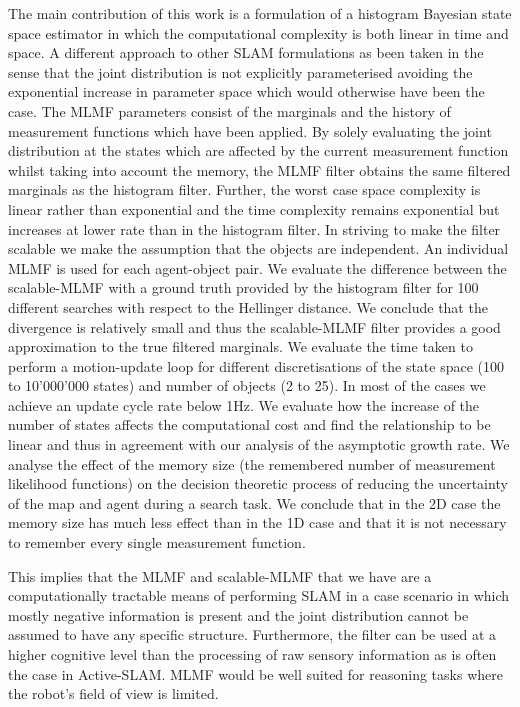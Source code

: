 The main contribution of this work is a formulation of a histogram Bayesian state space estimator in which the computational complexity is 
both linear in time and space. A different approach to other SLAM formulations as been taken in the sense that
the joint distribution is not explicitly parameterised avoiding the exponential increase in parameter space which would otherwise have been the case. 
The MLMF parameters consist of the marginals and the history of measurement functions which have been applied. By solely evaluating the joint 
distribution at the states which are affected by the current measurement function whilst taking into account the 
memory, the MLMF filter obtains the same filtered marginals as the histogram filter. Further, the worst case space complexity is 
linear rather than exponential and the time complexity remains exponential but increases at lower rate than in the histogram filter.
In striving to make the filter scalable we make the assumption that the objects are independent. An individual MLMF
is used for each agent-object pair. We evaluate the difference between the scalable-MLMF with a ground truth provided 
by the histogram filter for 100 different searches with respect to the Hellinger distance. We conclude that 
the divergence is relatively small and thus the scalable-MLMF filter provides a good approximation to the true filtered
marginals. We evaluate the time taken to perform a motion-update loop for different discretisations of the state 
space (100 to 10'000'000 states) and number of objects (2 to 25). In most of the cases we achieve an update cycle rate below 1Hz. 
We evaluate how the increase of the number of states affects the computational cost and find  the relationship to be linear and thus 
in agreement with our analysis of the asymptotic growth rate. We analyse the effect of the memory size 
(the remembered number of measurement likelihood functions) on the decision theoretic process of reducing 
the uncertainty of the map and agent during a search task. 
We conclude that in the 2D case the memory size has much less effect than in the 1D case and that it 
is not necessary to remember every single measurement function.

This implies that the MLMF and scalable-MLMF that we have are a computationally tractable means of 
performing SLAM in a case scenario in which mostly negative information is present and the 
joint distribution cannot be assumed to have any specific structure. Furthermore, the filter can be used at a higher cognitive level than 
the processing of raw sensory information as is often the case in Active-SLAM. MLMF would be well suited for reasoning tasks 
where the robot's field of view is limited.

